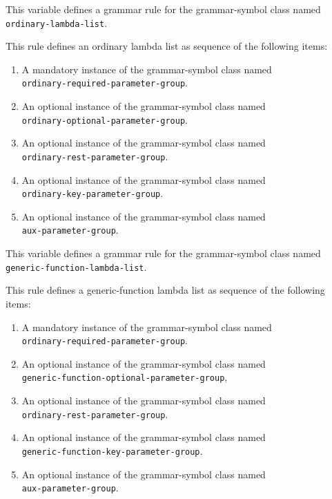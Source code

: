 
This variable defines a grammar rule for the grammar-symbol class
named \texttt{ordinary-lambda-list}.

This rule defines an ordinary lambda list as sequence of the following
items:

\begin{enumerate}
\item A mandatory instance of the grammar-symbol class named\\
  \texttt{ordinary-required-parameter-group}.
\item An optional instance of the grammar-symbol class named\\
  \texttt{ordinary-optional-parameter-group}.
\item An optional instance of the grammar-symbol class named\\
\texttt{ordinary-rest-parameter-group}.
\item An optional instance of the grammar-symbol class named\\
\texttt{ordinary-key-parameter-group}.
\item An optional instance of the grammar-symbol class named\\
\texttt{aux-parameter-group}.
\end{enumerate}


This variable defines a grammar rule for the grammar-symbol class
named \texttt{generic-function-lambda-list}.

This rule defines a generic-function lambda list as sequence of the
following items:

\begin{enumerate}
\item A mandatory instance of the grammar-symbol class named\\
  \texttt{ordinary-required-parameter-group}.
\item An optional instance of the grammar-symbol class named\\
\texttt{generic-function-optional-parameter-group},
\item An optional instance of the grammar-symbol class named\\
\texttt{ordinary-rest-parameter-group}.
\item An optional instance of the grammar-symbol class named\\
\texttt{generic-function-key-parameter-group}.
\item An optional instance of the grammar-symbol class named\\
\texttt{aux-parameter-group}.
\end{enumerate}


